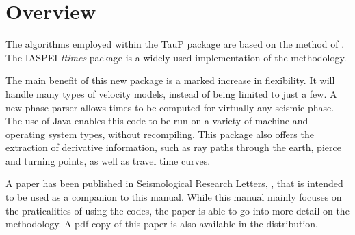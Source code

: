 
\section{Overview}


The algorithms employed within the TauP package are based on the
method of \cite{bulandchapman}.
The IASPEI \textit{ttimes} package is a widely-used implementation of
the methodology.

The main benefit of this new package is a marked increase in flexibility. It
will handle many types of velocity models, instead of being limited to
just a few. A new phase parser allows times to be computed for virtually
any seismic phase. The use of Java enables
this code to be run on a variety of machine and operating system types,
without recompiling. This package also offers
the extraction of derivative information, such as ray paths through the
earth, pierce and turning points, as well as travel time curves.

A paper has been published in Seismological Research Letters,
\cite{taupsrl},
that is intended to be used as a companion to this manual. While this manual
mainly focuses on the praticalities of using the codes,
the paper is able to go into more detail on the methodology. A pdf copy of
this paper is also available in the distribution.
